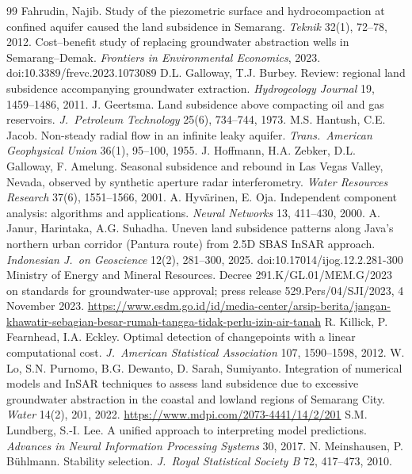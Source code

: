 \begin{thebibliography}{99}
 Fahrudin, Najib. Study of the piezometric surface and hydrocompaction at confined aquifer caused the land subsidence in Semarang. \emph{Teknik} 32(1), 72--78, 2012.
 Cost--benefit study of replacing groundwater abstraction wells in Semarang--Demak. \emph{Frontiers in Environmental Economics}, 2023. doi:10.3389/frevc.2023.1073089
 D.L. Galloway, T.J. Burbey. Review: regional land subsidence accompanying groundwater extraction. \emph{Hydrogeology Journal} 19, 1459--1486, 2011.
 J. Geertsma. Land subsidence above compacting oil and gas reservoirs. \emph{J.\ Petroleum Technology} 25(6), 734--744, 1973.
 M.S. Hantush, C.E. Jacob. Non-steady radial flow in an infinite leaky aquifer. \emph{Trans.\ American Geophysical Union} 36(1), 95--100, 1955.
 J. Hoffmann, H.A. Zebker, D.L. Galloway, F. Amelung. Seasonal subsidence and rebound in Las Vegas Valley, Nevada, observed by synthetic aperture radar interferometry. \emph{Water Resources Research} 37(6), 1551--1566, 2001.
 A. Hyv\"arinen, E. Oja. Independent component analysis: algorithms and applications. \emph{Neural Networks} 13, 411--430, 2000.
 A. Janur, Harintaka, A.G. Suhadha. Uneven land subsidence patterns along Java's northern urban corridor (Pantura route) from 2.5D SBAS InSAR approach. \emph{Indonesian J.\ on Geoscience} 12(2), 281--300, 2025. doi:10.17014/ijog.12.2.281-300
 Ministry of Energy and Mineral Resources. Decree 291.K/GL.01/MEM.G/2023 on standards for groundwater-use approval; press release 529.Pers/04/SJI/2023, 4 November 2023. \url{https://www.esdm.go.id/id/media-center/arsip-berita/jangan-khawatir-sebagian-besar-rumah-tangga-tidak-perlu-izin-air-tanah}
 R. Killick, P. Fearnhead, I.A. Eckley. Optimal detection of changepoints with a linear computational cost. \emph{J.\ American Statistical Association} 107, 1590--1598, 2012.
 W. Lo, S.N. Purnomo, B.G. Dewanto, D. Sarah, Sumiyanto. Integration of numerical models and InSAR techniques to assess land subsidence due to excessive groundwater abstraction in the coastal and lowland regions of Semarang City. \emph{Water} 14(2), 201, 2022. \url{https://www.mdpi.com/2073-4441/14/2/201}
 S.M. Lundberg, S.-I. Lee. A unified approach to interpreting model predictions. \emph{Advances in Neural Information Processing Systems} 30, 2017.
 N. Meinshausen, P. B\"uhlmann. Stability selection. \emph{J.\ Royal Statistical Society B} 72, 417--473, 2010.

\end{thebibliography}
